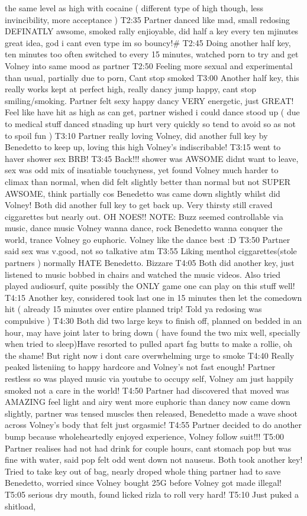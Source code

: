 \documentclass[12pt]{book}
\begin{document}
the same level as high with cocaine ( different type of high though, less invincibility, more acceptance ) T2:35 Partner danced like mad, small redosing DEFINATLY awsome, smoked rally enjioyable, did half a key every ten mjinutes great idea, god i cant even type im so bouncy!\# T2:45 Doing another half key, ten minutes too often switched to every 15 minutes, watched porn to try and get Volney into same mood as partner T2:50 Feeling more sexual and experimental than usual, partially due to porn, Cant stop smoked T3:00 Another half key, this really works kept at perfect high, really dancy jump happy, cant stop smiling/smoking. Partner felt sexy happy dancy VERY energetic, just GREAT! Feel like have hit as high as can get, partner wished i could dance stood up ( due to medical stuff danced stnading up hurt very quickly so tend to avoid so as not to spoil fun ) T3:10 Partner really loving Volney, did another full key by Benedetto to keep up, loving this high Volney's indiscribable! T3:15 went to haver shower sex BRB! T3:45 Back!!! shower was AWSOME didnt want to leave, sex was odd mix of insatiable touchyness, yet found Volney much harder to climax than normal, when did felt slightly better than normal but not SUPER AWSOME, think partially cos Benedetto was came down slightly whilst did Volney! Both did another full key to get back up. Very thirsty still craved ciggarettes but nearly out. OH NOES!! NOTE: Buzz seemed controllable via music, dance music Volney wanna dance, rock Benedetto wanna conquer the world, trance Volney go euphoric. Volney like the dance best :D T3:50 Partner said sex was v.good, not so talkative atm T3:55 Liking menthol ciggarettes(stole partners ) normally HATE Benedetto. Bizzare T4:05 Both did another key, just listened to music bobbed in chairs and watched the music videos. Also tried played audiosurf, quite possibly the ONLY game one can play on this stuff well! T4:15 Another key, considered took last one in 15 minutes then let the comedown hit ( already 15 minutes over entire planned trip! Told ya redosing was compulsive ) T4:30 Both did two large keys to finish off, planned on bedded in an hour, may have joint later to bring down ( have found the two mix well, specially when tried to sleep)Have resorted to pulled apart fag butts to make a rollie, oh the shame! But right now i dont care overwhelming urge to smoke T4:40 Really peaked listeniing to happy hardcore and Volney's not fast enough! Partner restless so was played music via youtube to occupy self, Volney am just happily smoked not a care in the world! T4:50 Partner had discovered that moved was AMAZING feel light and airy went more euphoric than dancy now came down slightly, partner was tensed muscles then released, Benedetto made a wave shoot across Volney's body that felt just orgasmic! T4:55 Partner decided to do another bump because wholeheartedly enjoyed experience, Volney follow suit!!! T5:00 Partner realises had not had drink for couple hours, cant stomach pop but was fine with water, said pop felt odd went down not nauseus. Both took another key! Tried to take key out of bag, nearly droped whole thing partner had to save Benedetto, worried since Volney bought 25G before Volney got made illegal! T5:05 serious dry mouth, found licked rizla to roll very hard! T5:10 Just puked a shitload, 
\end{document}
